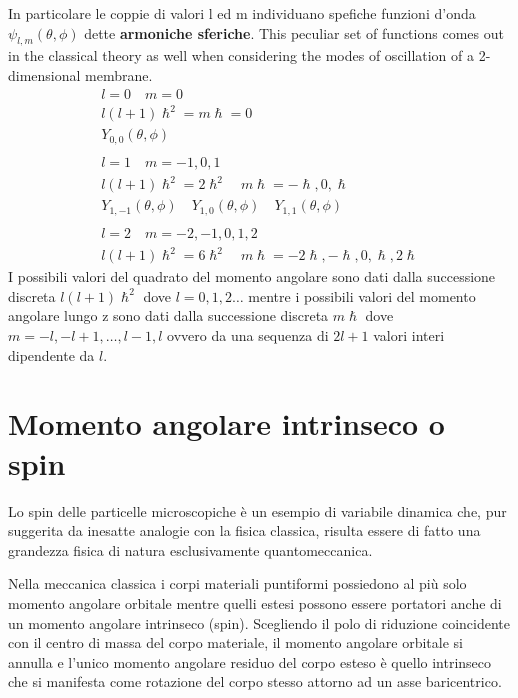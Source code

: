 In particolare le coppie di valori l ed m individuano spefiche funzioni
d'onda \(\psi_{l,m}(\theta,\phi)\) dette \textbf{armoniche sferiche}.
This peculiar set of functions comes out in the classical theory as well
when considering the modes of oscillation of a 2-dimensional membrane.
\marginnote
{
   \begin{gather*}
            l = 0 \quad m = 0 \\
                  l(l+1) \hslash^2 = m \hslash = 0 \\
                  Y_{0,0}(\theta,\phi) \\ \\
                  l = 1 \quad m = -1,0,1 \\
                  l(l+1) \hslash^2 = 2 \hslash^2 \quad m \hslash = - \hslash,0, \hslash \\
                  Y_{1,-1}(\theta,\phi) \quad Y_{1,0}(\theta,\phi) \quad Y_{1,1}(\theta,\phi) \\ \\
                        l = 2 \quad m = -2,-1,0,1,2 \\
                        l(l+1) \hslash^2 = 6 \hslash^2 \quad m \hslash = -2 \hslash, - \hslash,0,\hslash,2 \hslash
        \end{gather*}
}
I possibili valori del quadrato del momento angolare sono dati dalla
successione discreta \(l(l+1) \hslash^{2}\) dove \(l=0,1,2 \dots\)
mentre i possibili valori del momento angolare lungo z sono dati dalla
successione discreta \(m \hslash\) dove
\(m = -l, -l + 1, \dots, l-1, l\) ovvero da una sequenza di \(2l+1\)
valori interi dipendente da \(l\).

\section{Momento angolare intrinseco o spin}\label{sec:momento-angolare-intrinseco-o-spin}

Lo spin delle particelle microscopiche è un esempio di variabile dinamica che, pur suggerita da inesatte analogie con
la fisica classica, risulta essere di fatto una grandezza fisica di natura esclusivamente quantomeccanica.

Nella meccanica classica i corpi materiali puntiformi possiedono al più
solo momento angolare orbitale mentre quelli estesi possono essere
portatori anche di un momento angolare intrinseco (spin).
Scegliendo il
polo di riduzione coincidente con il centro di massa del corpo
materiale, il momento angolare orbitale si annulla e l'unico momento
angolare residuo del corpo esteso è quello intrinseco che si manifesta
come rotazione del corpo stesso attorno ad un asse baricentrico.

